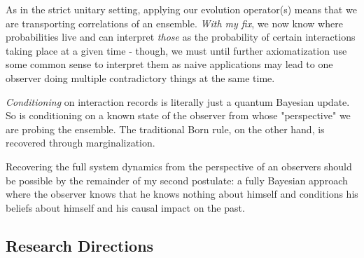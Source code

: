 \documentclass{article}
\begin{document}
As in the strict unitary setting, applying our evolution operator(s) means that we are transporting correlations of an ensemble. \textit{With my fix}, we now know where probabilities live and can interpret \textit{those} as the probability of certain interactions taking place at a given time - though, we must until further axiomatization use some common sense to interpret them as naive applications may lead to one observer doing multiple contradictory things at the same time.

\textit{Conditioning} on interaction records is literally just a quantum Bayesian update. So is conditioning on a known state of the observer from whose "perspective" we are probing the ensemble. The traditional Born rule, on the other hand, is recovered through marginalization.

Recovering the full system dynamics from the perspective of an observers should be possible by the remainder of my second postulate: a fully Bayesian approach where the observer knows that he knows nothing about himself and conditions his beliefs about himself and his causal impact on the past.

\subsection{Research Directions}
\end{document}
